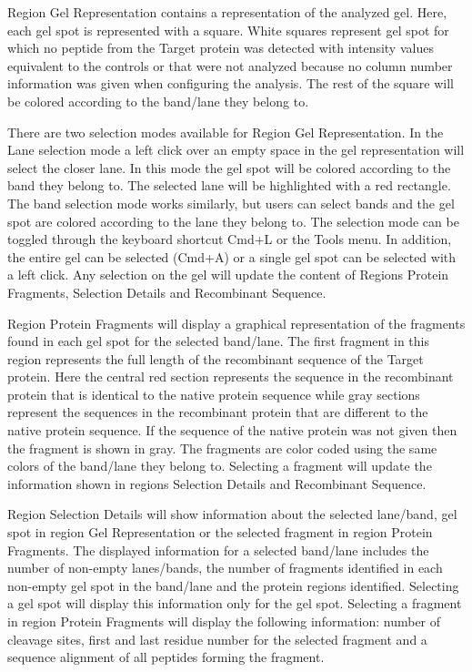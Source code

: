 Region Gel Representation contains a representation of the analyzed gel. Here, each
gel spot is represented with a square. White squares represent gel spot for which
no peptide from the Target protein was detected with intensity values equivalent
to the controls or that were not analyzed because no column number information was
given when configuring the analysis. The rest of the square will be colored according
to the band/lane they belong to.

There are two selection modes available for Region Gel Representation. In the Lane
selection mode a left click over an empty space in the gel representation will select
the closer lane. In this mode the gel spot will be colored according to the band
they belong to. The selected lane will be highlighted with a red rectangle. The band
selection mode works similarly, but users can select bands and the gel spot are colored
according to the lane they belong to. The selection mode can be toggled through
the keyboard shortcut Cmd+L or the Tools menu. In addition, the entire gel can be
selected (Cmd+A) or a single gel spot can be selected with a left click. Any selection
on the gel will update the content of Regions Protein Fragments, Selection Details
and Recombinant Sequence.

Region Protein Fragments will display a graphical representation of the fragments
found in each gel spot for the selected band/lane. The first fragment in this region
represents the full length of the recombinant sequence of the Target protein. Here
the central red section represents the sequence in the recombinant protein that is
identical to the native protein sequence while gray sections represent the sequences
in the recombinant protein that are different to the native protein sequence. If
the sequence of the native protein was not given then the fragment is shown in gray.
The fragments are color coded using the same colors of the band/lane they belong to.
Selecting a fragment will update the information shown in regions Selection Details
and Recombinant Sequence.

Region Selection Details will show information about the selected lane/band, gel
spot in region Gel Representation or the selected fragment in region Protein Fragments.
The displayed information for a selected band/lane includes the number of non-empty
lanes/bands, the number of fragments identified in each non-empty gel spot in the
band/lane and the protein regions identified. Selecting a gel spot will display this
information only for the gel spot. Selecting a fragment in region Protein Fragments
will display the following information: number of cleavage sites, first and last
residue number for the selected fragment and a sequence alignment of all peptides
forming the fragment.


